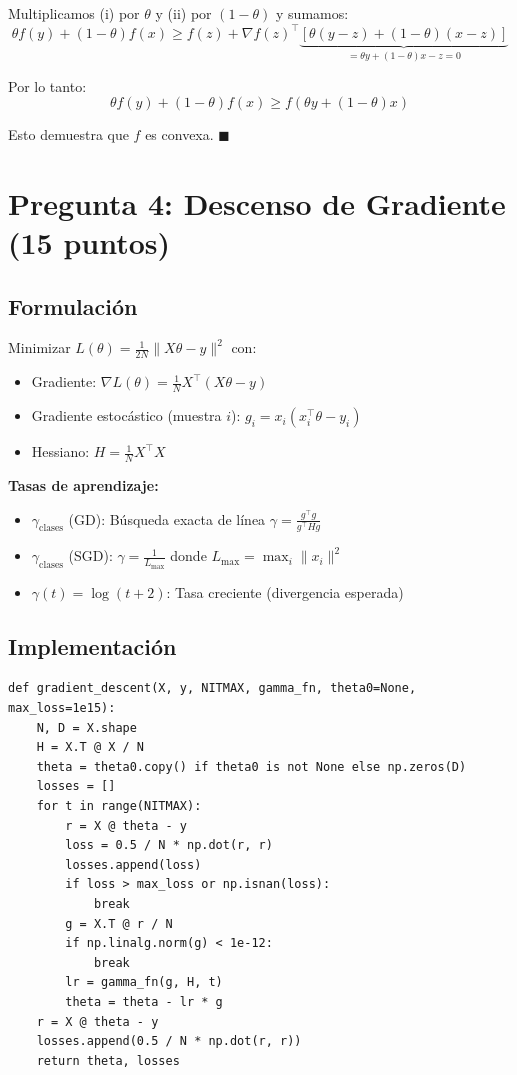 \documentclass[11pt,a4paper]{article}
\begin{document}
Multiplicamos (i) por $\theta$ y (ii) por $(1-\theta)$ y sumamos:
\[\theta f(y) + (1-\theta)f(x) \geq f(z) + \nabla f(z)^\top\underbrace{[\theta(y-z) + (1-\theta)(x-z)]}_{= \theta y + (1-\theta)x - z = 0}\]

Por lo tanto:
\[\boxed{\theta f(y) + (1-\theta)f(x) \geq f(\theta y + (1-\theta)x)}\]

Esto demuestra que $f$ es convexa. \hfill$\blacksquare$

\section{Pregunta 4: Descenso de Gradiente (15 puntos)}

\subsection{Formulación}
Minimizar $L(\theta) = \frac{1}{2N}\|X\theta - y\|^2$ con:
\begin{itemize}
    \item Gradiente: $\nabla L(\theta) = \frac{1}{N}X^\top(X\theta - y)$
    \item Gradiente estocástico (muestra $i$): $g_i = x_i(x_i^\top\theta - y_i)$
    \item Hessiano: $H = \frac{1}{N}X^\top X$
\end{itemize}

\textbf{Tasas de aprendizaje:}
\begin{itemize}
    \item $\gamma_{\text{clases}}$ (GD): Búsqueda exacta de línea $\gamma = \frac{g^\top g}{g^\top H g}$
    \item $\gamma_{\text{clases}}$ (SGD): $\gamma = \frac{1}{L_{\max}}$ donde $L_{\max} = \max_i \|x_i\|^2$
    \item $\gamma(t) = \log(t+2)$: Tasa creciente (divergencia esperada)
\end{itemize}

\subsection{Implementación}

\begin{lstlisting}[caption={Descenso de gradiente determinista}]
def gradient_descent(X, y, NITMAX, gamma_fn, theta0=None, max_loss=1e15):
    N, D = X.shape
    H = X.T @ X / N
    theta = theta0.copy() if theta0 is not None else np.zeros(D)
    losses = []
    for t in range(NITMAX):
        r = X @ theta - y
        loss = 0.5 / N * np.dot(r, r)
        losses.append(loss)
        if loss > max_loss or np.isnan(loss):
            break
        g = X.T @ r / N
        if np.linalg.norm(g) < 1e-12:
            break
        lr = gamma_fn(g, H, t)
        theta = theta - lr * g
    r = X @ theta - y
    losses.append(0.5 / N * np.dot(r, r))
    return theta, losses
\end{lstlisting}
\end{document}
